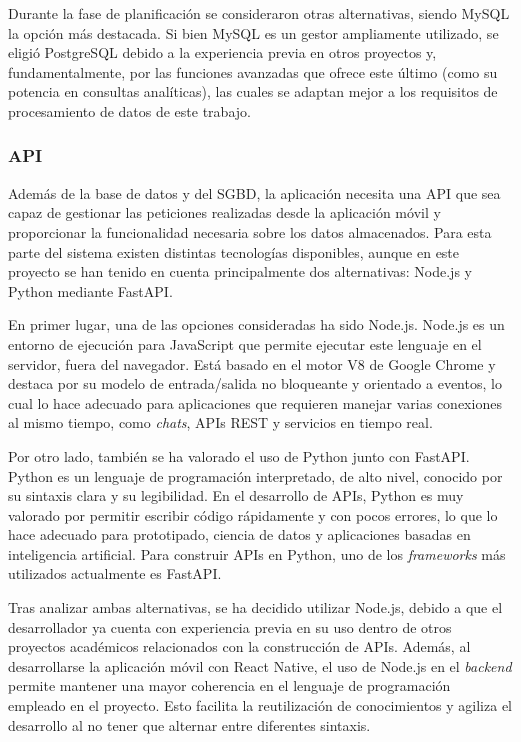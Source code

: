 Durante la fase de planificación se consideraron otras alternativas, siendo MySQL la opción más destacada. Si bien MySQL es un gestor ampliamente utilizado, se eligió PostgreSQL debido a la experiencia previa en otros proyectos y, fundamentalmente, por las funciones avanzadas que ofrece este último (como su potencia en consultas analíticas), las cuales se adaptan mejor a los requisitos de procesamiento de datos de este trabajo.
\subsubsection{API}

Además de la base de datos y del SGBD, la aplicación necesita una API que sea capaz de gestionar las peticiones realizadas desde la aplicación móvil y proporcionar la funcionalidad necesaria sobre los datos almacenados. Para esta parte del sistema existen distintas tecnologías disponibles, aunque en este proyecto se han tenido en cuenta principalmente dos alternativas: Node.js y Python mediante FastAPI.

En primer lugar, una de las opciones consideradas ha sido Node.js. Node.js es un entorno de ejecución para JavaScript que permite ejecutar este lenguaje en el servidor, fuera del navegador. Está basado en el motor V8 de Google Chrome y destaca por su modelo de entrada/salida no bloqueante y orientado a eventos, lo cual lo hace adecuado para aplicaciones que requieren manejar varias conexiones al mismo tiempo, como \textit{chats}, APIs REST y servicios en tiempo real.

Por otro lado, también se ha valorado el uso de Python junto con FastAPI. Python es un lenguaje de programación interpretado, de alto nivel, conocido por su sintaxis clara y su legibilidad. En el desarrollo de APIs, Python es muy valorado por permitir escribir código rápidamente y con pocos errores, lo que lo hace adecuado para prototipado, ciencia de datos y aplicaciones basadas en inteligencia artificial. Para construir APIs en Python, uno de los \textit{frameworks} más utilizados actualmente es FastAPI.

Tras analizar ambas alternativas, se ha decidido utilizar Node.js, debido a que el desarrollador ya cuenta con experiencia previa en su uso dentro de otros proyectos académicos relacionados con la construcción de APIs. Además, al desarrollarse la aplicación móvil con React Native, el uso de Node.js en el \textit{backend} permite mantener una mayor coherencia en el lenguaje de programación empleado en el proyecto. Esto facilita la reutilización de conocimientos y agiliza el desarrollo al no tener que alternar entre diferentes sintaxis.

